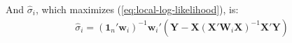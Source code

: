 \documentclass[authoryear, review, 11pt]{elsarticle}
\begin{document}
	And $\hat{\sigma}_i$, which maximizes (\ref{eq:local-log-likelihood}), is:
	\begin{eqnarray}
		\hat{\sigma}_i = \left(\bm{1}_n'\bm{w}_i \right)^{-1} \bm{w}_i'\left(\bm{Y}-\bm{X}\left(\bm{X}'\bm{W}_i\bm{X}\right)^{-1}\bm{X}'\bm{Y}\right)
	\end{eqnarray}
	
	\begin{comment}
	Estimation of $\hat{\bm{\beta}}_i$ and $\hat{\sigma}_i$ is by maximum local likelihood, which is implemented by setting the derivatives of (\ref{eq:local-log-likelihood}) to zero:
	\begin{eqnarray}
		\left\{\frac{\partial \ell_i}{\partial \bm{\beta}_i} \right\}_j =   \sum_{i'=1}^n \left\{ x_{i'j} w_{ii'} \sigma^{-2}_i \left( y_{i'} - \bm{x}'_{i'} \bm{\beta}_i \right) \right\} \\
		\frac{\partial \ell_i}{\partial \sigma_i^2} \bigg|_{\hat{\beta}_i} &=& -\frac{1}{2} \sum_{i'=1}^n w_{ii'} \left\{ \left(\sigma_i^{2}\right)^{-1} - \left(\sigma_i^{2}\right)^{-2} \left( y_i - \bm{x}_i'\bm{\hat{\beta}}_i \right)^2 \right\} \\
		\hat{\sigma}_i^2 &=& \left(\sum_{i'=1}^n w_{ii'}\right)^{-1} \sum_{i'=1}^n w_{ii'} \left(y_i - \bm{x}_i'\hat{\bm{\beta}}_i\right)
	\end{eqnarray}
		
		\left\{\frac{\partial^2 \ell_i}{\partial \bm{\beta}_i \partial \bm{\beta}'_i} \right\}_{j,k} = -\sum_{i'=1}^n \left\{ x_{i'j} x_{i'k} w_{ii'} \sigma^{-2}_i \right\}
	\end{eqnarray}
	
	So the observed Fisher information in the locally weighted sample is
	\begin{eqnarray}
		\bm{\mathcal{J}}_i &=& \sigma^{-2}_i \left( \begin{array}{ccc} \sum_{i'=1}^n  w_{ii'} x^2_{i'1}   & \dots & \sum_{i'=1}^n w_{ii'} x_{i'1} x_{i'p}   \\ \vdots & \ddots & \vdots \\ \sum_{i'=1}^n  w_{ii'} x_{i'p} x_{i'1}    & \dots & \sum_{i'=1}^n  w_{ii'} x^2_{i'p}  \end{array} \right) \\
		&=& \sigma^{-2}_i \sum_{i'=1}^n w_{ii'}\left( \begin{array}{ccc}  x^2_{i'1} & \dots & x_{i'1} x_{i'p} \\ \vdots & \ddots & \vdots \\ x_{i'p} x_{i'1} & \dots &  x^2_{i'p} \end{array} \right) \\
		&=& \sigma^{-2}_i \sum_{i'=1}^n w_{ii'} \bm{x}_{i'} \bm{x}'_{i'}
	\end{eqnarray}	
	
	The form of the observed Fisher information suggests that the information in the data $\bm{x}_{i'}$ about the coefficients at location $s_i$ is proportional to the weight $w_{ii'}$.
	\end{comment}
\end{document}
